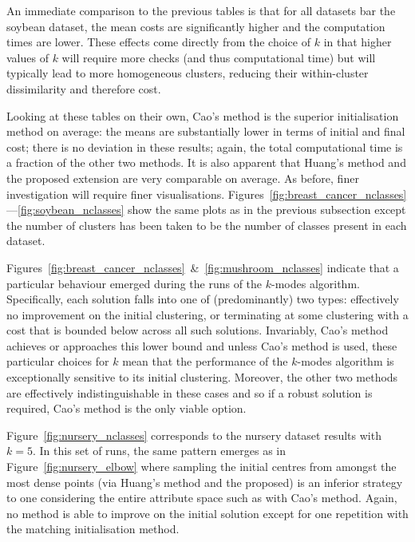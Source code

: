 An immediate comparison to the previous tables is that for all datasets bar the
soybean dataset, the mean costs are significantly higher and the computation
times are lower. These effects come directly from the choice of \(k\) in that
higher values of \(k\) will require more checks (and thus computational time)
but will typically lead to more homogeneous clusters, reducing their
within-cluster dissimilarity and therefore cost.

Looking at these tables on their own, Cao's method is the superior
initialisation method on average: the means are substantially lower in terms of
initial and final cost; there is no deviation in these results; again, the total
computational time is a fraction of the other two methods. It is also apparent
that Huang's method and the proposed extension are very comparable on average.
As before, finer investigation will require finer visualisations.
Figures~\ref{fig:breast_cancer_nclasses}---\ref{fig:soybean_nclasses} show the
same plots as in the previous subsection except the number of clusters has been
taken to be the number of classes present in each dataset.

Figures~\ref{fig:breast_cancer_nclasses}~\&~\ref{fig:mushroom_nclasses} indicate
that a particular behaviour emerged during the runs of the \(k\)-modes
algorithm. Specifically, each solution falls into one of (predominantly) two
types: effectively no improvement on the initial clustering, or terminating at
some clustering with a cost that is bounded below across all such solutions.
Invariably, Cao's method achieves or approaches this lower bound and unless
Cao's method is used, these particular choices for \(k\) mean that the
performance of the \(k\)-modes algorithm is exceptionally sensitive to its
initial clustering. Moreover, the other two methods are effectively
indistinguishable in these cases and so if a robust solution is required, Cao's
method is the only viable option.


Figure~\ref{fig:nursery_nclasses} corresponds to the nursery dataset results
with \(k=5\). In this set of runs, the same pattern emerges as in
Figure~\ref{fig:nursery_elbow} where sampling the initial centres from amongst
the most dense points (via Huang's method and the proposed) is an inferior
strategy to one considering the entire attribute space such as with Cao's
method. Again, no method is able to improve on the initial solution except for
one repetition with the matching initialisation method.

